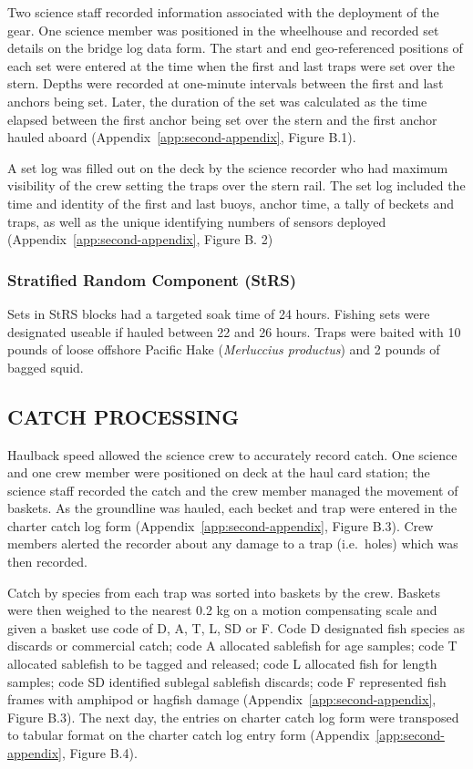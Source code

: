 \documentclass[12pt]{article}\usepackage[]{graphicx}\usepackage[]{color}
\begin{document}
Two science staff recorded information associated with the deployment of the gear. One science member was positioned in the wheelhouse and recorded set details on the bridge log data form. The start and end geo-referenced positions of each set were entered at the time when the first and last traps were set over the stern. Depths were recorded at one-minute intervals between the first and last anchors being set. Later, the duration of the set was calculated as the time elapsed between the first anchor being set over the stern and the first anchor hauled aboard (Appendix~\ref{app:second-appendix}, Figure B.1).

A set log was filled out on the deck by the science recorder who had maximum visibility of the crew setting the traps over the stern rail. The set log included the time and identity of the first and last buoys, anchor time, a tally of beckets and traps, as well as the unique identifying numbers of sensors deployed (Appendix~\ref{app:second-appendix}, Figure B. 2)

\hypertarget{stratified-random-component-strs}{%
\subsubsection{Stratified Random Component (StRS)}\label{stratified-random-component-strs}}

Sets in StRS blocks had a targeted soak time of 24 hours. Fishing sets were designated useable if hauled between 22 and 26 hours. Traps were baited with 10 pounds of loose offshore Pacific Hake (\emph{Merluccius productus}) and 2 pounds of bagged squid.

\hypertarget{catch-processing}{%
\subsection{CATCH PROCESSING}\label{catch-processing}}

Haulback speed allowed the science crew to accurately record catch. One science and one crew member were positioned on deck at the haul card station; the science staff recorded the catch and the crew member managed the movement of baskets. As the groundline was hauled, each becket and trap were entered in the charter catch log form (Appendix~\ref{app:second-appendix}, Figure B.3). Crew members alerted the recorder about any damage to a trap (i.e.~holes) which was then recorded.

Catch by species from each trap was sorted into baskets by the crew. Baskets were then weighed to the nearest 0.2 kg on a motion compensating scale and given a basket use code of D, A, T, L, SD or F. Code D designated fish species as discards or commercial catch; code A allocated sablefish for age samples; code T allocated sablefish to be tagged and released; code L allocated fish for length samples; code SD identified sublegal sablefish discards; code F represented fish frames with amphipod or hagfish damage (Appendix~\ref{app:second-appendix}, Figure B.3). The next day, the entries on charter catch log form were transposed to tabular format on the charter catch log entry form (Appendix~\ref{app:second-appendix}, Figure B.4).
\end{document}
